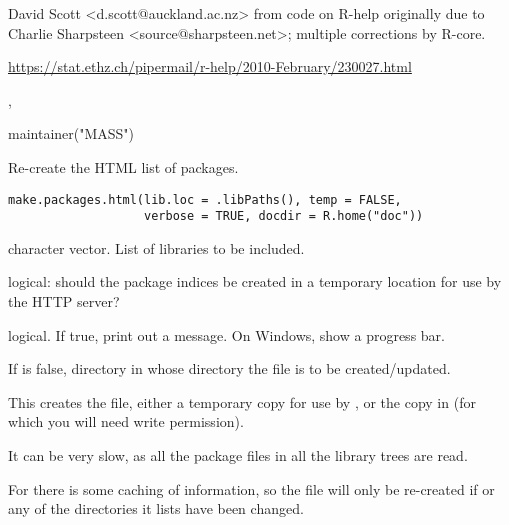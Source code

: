 %
\begin{Author}\relax
David Scott <d.scott@auckland.ac.nz> from code on R-help originally
due to Charlie Sharpsteen <source@sharpsteen.net>; multiple corrections
by R-core.
\end{Author}
%
\begin{References}\relax
\url{https://stat.ethz.ch/pipermail/r-help/2010-February/230027.html}
\end{References}
%
\begin{SeeAlso}\relax
{}, 
\end{SeeAlso}
%
\begin{Examples}
\begin{ExampleCode}
maintainer("MASS")
\end{ExampleCode}
\end{Examples}
%
\begin{Description}\relax
Re-create the HTML list of packages.
\end{Description}
%
\begin{Usage}
\begin{verbatim}
make.packages.html(lib.loc = .libPaths(), temp = FALSE,
                   verbose = TRUE, docdir = R.home("doc"))
\end{verbatim}
\end{Usage}
%
\begin{Arguments}
\begin{ldescription}
\item[\code{lib.loc}] character vector.  List of libraries to be included.
\item[\code{temp}] logical: should the package indices be created in a
temporary location for use by the HTTP server?
\item[\code{verbose}] logical.  If true, print out a message.
On Windows, show a progress bar.

\item[\code{docdir}] If  is false, directory in whose 
directory the  file is to be created/updated.
\end{ldescription}
\end{Arguments}
%
\begin{Details}\relax
This creates the  file, either a temporary copy
for use by , or the copy in
(for which you will need write permission).

It can be very slow, as all the package  files in
all the library trees are read.

For  there is some caching of information, so the
file will only be re-created if  or any of the
directories it lists have been changed.
\end{Details}
